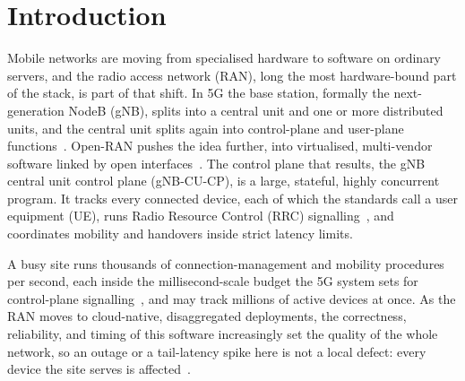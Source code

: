 \documentclass[english,oneside,a4paper,censored,csm,software-track-2020]{HYthesisML}
\begin{document}
\cleardoublepage

\mainmatter

\singlespacing

\chapter{Introduction}

Mobile networks are moving from specialised hardware to software on ordinary servers, and the
radio access network (RAN), long the most hardware-bound part of the stack, is part of that
shift. In 5G the base station, formally the next-generation NodeB (gNB), splits into a central
unit and one or more distributed units, and the central unit splits again into control-plane and
user-plane functions~\cite{3gpp38401,3gpp38300}. Open-RAN pushes the idea further, into
virtualised, multi-vendor software linked by open interfaces~\cite{polese2023oran}. The control
plane that results, the gNB central unit control plane (gNB-CU-CP), is a large, stateful, highly
concurrent program. It tracks every connected device, each of which the standards call a user
equipment (UE), runs Radio Resource Control (RRC) signalling~\cite{3gpp38331}, and coordinates
mobility and handovers inside strict latency limits.

A busy site runs thousands of connection-management and mobility procedures per second, each
inside the millisecond-scale budget the 5G system sets for control-plane
signalling~\cite{3gpp38913}, and may track millions of active devices at once. As the RAN moves
to cloud-native, disaggregated deployments, the correctness, reliability, and timing of this
software increasingly set the quality of the whole network, so an outage or a tail-latency spike
here is not a local defect: every device the site serves is
affected~\cite{dean2013tail,barroso2017microseconds}.
\end{document}
